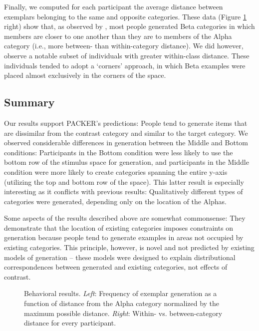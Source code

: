 \documentclass[10pt,letterpaper]{article}
\newcommand\inputpgf[2]{{
\let\pgfimageWithoutPath\pgfimage
\renewcommand{\pgfimage}[2][]{\pgfimageWithoutPath[##1]{#1/##2}}

}}
\begin{document}
Finally, we computed for each participant the average distance between exemplars belonging to the same and opposite categories. These data (Figure \ref{fig:distance.figs} right) show that, as observed by \citet{ward1994structured}, most people generated Beta categories in which members are closer to one another than they are to members of the Alpha category (i.e., more between- than within-category distance). We did however, observe a notable subset of individuals with greater within-class distance. These individuals tended to adopt a `corners' approach, in which Beta examples were placed almost exclusively in the corners of the space.


\subsection{Summary}

Our results support PACKER's predictions: People tend to generate items that are dissimilar from the contrast category and similar to the target category. We observed considerable differences in generation between the Middle and Bottom conditions: Participants in the Bottom condition were less likely to use the bottom row of the stimulus space for generation, and participants in the Middle condition were more likely to create categories spanning the entire y-axis (utilizing the top and bottom row of the space). This latter result is especially interesting as it conflicts with previous results: Qualitatively different types of categories were generated, depending only on the location of the Alphas. 

Some aspects of the results described above are somewhat commonsense: They demonstrate that the location of existing categories imposes constraints on generation because people tend to generate examples in areas not occupied by existing categories. This principle, however, is novel and not predicted by existing models of generation -- these models were designed to explain distributional correspondences between generated and existing categories, not effects of contrast.  

\begin{figure}
    \begin{center}
    \inputpgf{figs/}{distance.figs.pgf}
    \caption{Behavioral results. \textit{Left}: Frequency of exemplar generation as a function of distance from the Alpha category normalized by the maximum possible distance. \textit{Right}: Within- vs. between-category distance for every participant. }
    \label{fig:distance.figs}
    \end{center}
\end{figure}
\end{document}
